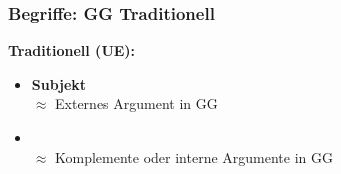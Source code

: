 \begin{frame}
\frametitle{Begriffe: GG \vs Traditionell}

\begin{minipage}[b]{0.4\textwidth}
	\footnotesize
	\textbf{Traditionell (UE):}
		\begin{itemize}
		\item \textbf{Subjekt}\\
		$\approx$ Externes Argument in GG
\medskip
		\item {}\\
		$\approx$ Komplemente oder interne Argumente in GG
		\end{itemize}	
  	\end{minipage}  
	\begin{minipage}[b]{0.55\textwidth}
		\begin{figure}
	\centering
	
	\end{figure}
\end{minipage}

\end{frame}


